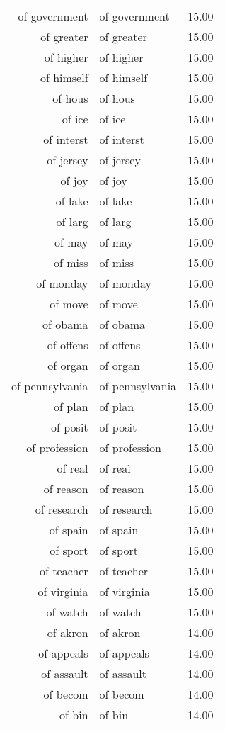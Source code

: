 \begin{table}[ht]
\begin{tabular}{rlr}
  of government & of government & 15.00 \\ 
  of greater & of greater & 15.00 \\ 
  of higher & of higher & 15.00 \\ 
  of himself & of himself & 15.00 \\ 
  of hous & of hous & 15.00 \\ 
  of ice & of ice & 15.00 \\ 
  of interst & of interst & 15.00 \\ 
  of jersey & of jersey & 15.00 \\ 
  of joy & of joy & 15.00 \\ 
  of lake & of lake & 15.00 \\ 
  of larg & of larg & 15.00 \\ 
  of may & of may & 15.00 \\ 
  of miss & of miss & 15.00 \\ 
  of monday & of monday & 15.00 \\ 
  of move & of move & 15.00 \\ 
  of obama & of obama & 15.00 \\ 
  of offens & of offens & 15.00 \\ 
  of organ & of organ & 15.00 \\ 
  of pennsylvania & of pennsylvania & 15.00 \\ 
  of plan & of plan & 15.00 \\ 
  of posit & of posit & 15.00 \\ 
  of profession & of profession & 15.00 \\ 
  of real & of real & 15.00 \\ 
  of reason & of reason & 15.00 \\ 
  of research & of research & 15.00 \\ 
  of spain & of spain & 15.00 \\ 
  of sport & of sport & 15.00 \\ 
  of teacher & of teacher & 15.00 \\ 
  of virginia & of virginia & 15.00 \\ 
  of watch & of watch & 15.00 \\ 
  of akron & of akron & 14.00 \\ 
  of appeals & of appeals & 14.00 \\ 
  of assault & of assault & 14.00 \\ 
  of becom & of becom & 14.00 \\ 
  of bin & of bin & 14.00 \\ 

\end{tabular}
\end{table}
